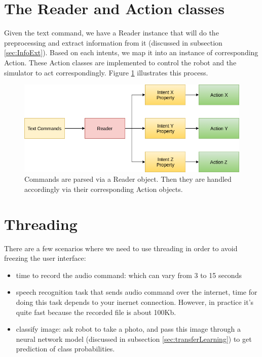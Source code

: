 \section{The Reader and Action classes}
Given the text command, we have a Reader instance that will do the preprocessing and extract information from it (discussed in subsection \ref{sec:InfoExt}). Based on each intents, we map it into an instance of corresponding Action. These Action classes are implemented to control the robot and the simulator to act correspondingly. Figure \ref{fig:readerAction} illustrates this process. 

\begin{figure}[!htb]
	\centering
	\includegraphics[width=0.9\hsize]{./figures/readerAction}
	\caption{Commands are parsed via a Reader object. Then they are handled accordingly via their corresponding Action objects.}
	\label{fig:readerAction}
\end{figure}

\section{Threading}
There are a few scenarios where we need to use threading in order to avoid freezing the user interface:
\begin{itemize}
	\item time to record the audio command: which can vary from 3 to 15 seconds
	\item speech recognition task that sends audio command over the internet, time for doing this task depends to your inernet connection. However, in practice it's quite fast because the recorded file is about 100Kb.
	\item classify image: ask robot to take a photo, and pass this image through a neural network model (discussed in subsection \ref{sec:transferLearning}) to get prediction of class probabilities.
\end{itemize}

